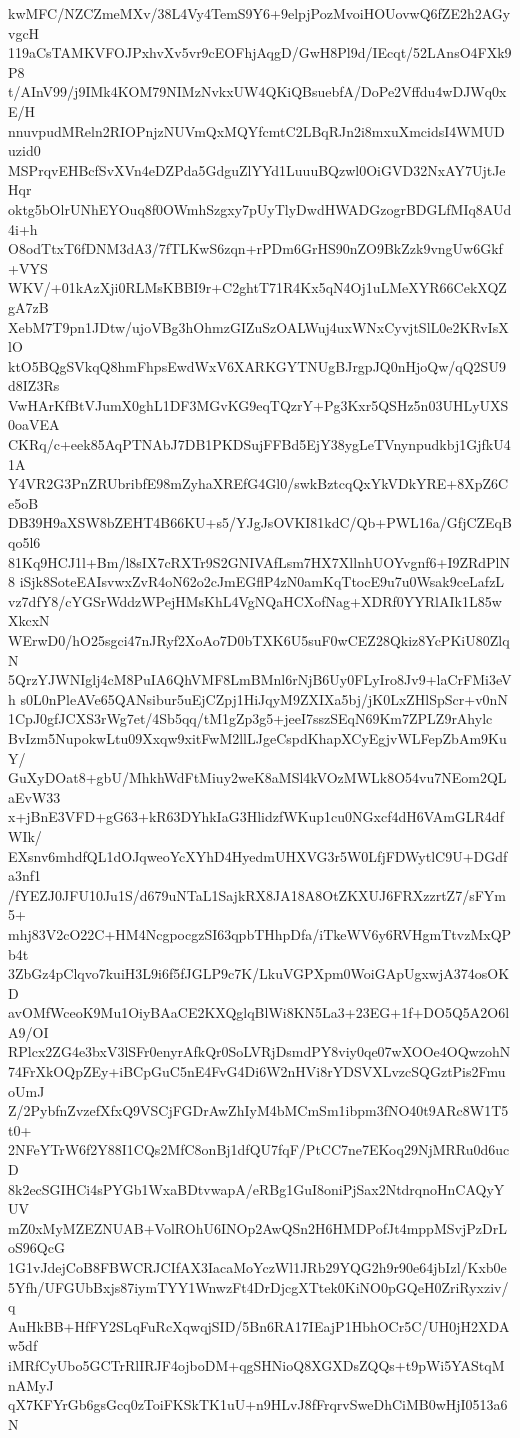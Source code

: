 kwMFC/NZCZmeMXv/38L4Vy4TemS9Y6+9elpjPozMvoiHOUovwQ6fZE2h2AGyvgcH
119aCsTAMKVFOJPxhvXv5vr9cEOFhjAqgD/GwH8Pl9d/IEcqt/52LAnsO4FXk9P8
t/AInV99/j9IMk4KOM79NIMzNvkxUW4QKiQBsuebfA/DoPe2Vffdu4wDJWq0xE/H
nnuvpudMReln2RIOPnjzNUVmQxMQYfcmtC2LBqRJn2i8mxuXmcidsI4WMUDuzid0
MSPrqvEHBcfSvXVn4eDZPda5GdguZlYYd1LuuuBQzwl0OiGVD32NxAY7UjtJeHqr
oktg5bOlrUNhEYOuq8f0OWmhSzgxy7pUyTlyDwdHWADGzogrBDGLfMIq8AUd4i+h
O8odTtxT6fDNM3dA3/7fTLKwS6zqn+rPDm6GrHS90nZO9BkZzk9vngUw6Gkf+VYS
WKV/+01kAzXji0RLMsKBBI9r+C2ghtT71R4Kx5qN4Oj1uLMeXYR66CekXQZgA7zB
XebM7T9pn1JDtw/ujoVBg3hOhmzGIZuSzOALWuj4uxWNxCyvjtSlL0e2KRvIsXlO
ktO5BQgSVkqQ8hmFhpsEwdWxV6XARKGYTNUgBJrgpJQ0nHjoQw/qQ2SU9d8IZ3Rs
VwHArKfBtVJumX0ghL1DF3MGvKG9eqTQzrY+Pg3Kxr5QSHz5n03UHLyUXS0oaVEA
CKRq/c+eek85AqPTNAbJ7DB1PKDSujFFBd5EjY38ygLeTVnynpudkbj1GjfkU41A
Y4VR2G3PnZRUbribfE98mZyhaXREfG4Gl0/swkBztcqQxYkVDkYRE+8XpZ6Ce5oB
DB39H9aXSW8bZEHT4B66KU+s5/YJgJsOVKI81kdC/Qb+PWL16a/GfjCZEqBqo5l6
81Kq9HCJ1l+Bm/l8sIX7cRXTr9S2GNIVAfLsm7HX7XllnhUOYvgnf6+I9ZRdPlN8
iSjk8SoteEAIsvwxZvR4oN62o2cJmEGflP4zN0amKqTtocE9u7u0Wsak9ceLafzL
vz7dfY8/cYGSrWddzWPejHMsKhL4VgNQaHCXofNag+XDRf0YYRlAIk1L85wXkcxN
WErwD0/hO25sgci47nJRyf2XoAo7D0bTXK6U5suF0wCEZ28Qkiz8YcPKiU80ZlqN
5QrzYJWNIglj4cM8PuIA6QhVMF8LmBMnl6rNjB6Uy0FLyIro8Jv9+laCrFMi3eVh
s0L0nPleAVe65QANsibur5uEjCZpj1HiJqyM9ZXIXa5bj/jK0LxZHlSpScr+v0nN
1CpJ0gfJCXS3rWg7et/4Sb5qq/tM1gZp3g5+jeeI7sszSEqN69Km7ZPLZ9rAhylc
BvIzm5NupokwLtu09Xxqw9xitFwM2llLJgeCspdKhapXCyEgjvWLFepZbAm9KuY/
GuXyDOat8+gbU/MhkhWdFtMiuy2weK8aMSl4kVOzMWLk8O54vu7NEom2QLaEvW33
x+jBnE3VFD+gG63+kR63DYhkIaG3HlidzfWKup1cu0NGxcf4dH6VAmGLR4dfWIk/
EXsnv6mhdfQL1dOJqweoYcXYhD4HyedmUHXVG3r5W0LfjFDWytlC9U+DGdfa3nf1
/fYEZJ0JFU10Ju1S/d679uNTaL1SajkRX8JA18A8OtZKXUJ6FRXzzrtZ7/sFYm5+
mhj83V2cO22C+HM4NcgpocgzSI63qpbTHhpDfa/iTkeWV6y6RVHgmTtvzMxQPb4t
3ZbGz4pClqvo7kuiH3L9i6f5fJGLP9c7K/LkuVGPXpm0WoiGApUgxwjA374osOKD
avOMfWceoK9Mu1OiyBAaCE2KXQglqBlWi8KN5La3+23EG+1f+DO5Q5A2O6lA9/OI
RPlcx2ZG4e3bxV3lSFr0enyrAfkQr0SoLVRjDsmdPY8viy0qe07wXOOe4OQwzohN
74FrXkOQpZEy+iBCpGuC5nE4FvG4Di6W2nHVi8rYDSVXLvzcSQGztPis2FmuoUmJ
Z/2PybfnZvzefXfxQ9VSCjFGDrAwZhIyM4bMCmSm1ibpm3fNO40t9ARc8W1T5t0+
2NFeYTrW6f2Y88I1CQs2MfC8onBj1dfQU7fqF/PtCC7ne7EKoq29NjMRRu0d6ucD
8k2ecSGIHCi4sPYGb1WxaBDtvwapA/eRBg1GuI8oniPjSax2NtdrqnoHnCAQyYUV
mZ0xMyMZEZNUAB+VolROhU6INOp2AwQSn2H6HMDPofJt4mppMSvjPzDrLoS96QcG
1G1vJdejCoB8FBWCRJCIfAX3IacaMoYczWl1JRb29YQG2h9r90e64jbIzl/Kxb0e
5Yfh/UFGUbBxjs87iymTYY1WnwzFt4DrDjcgXTtek0KiNO0pGQeH0ZriRyxziv/q
AuHkBB+HfFY2SLqFuRcXqwqjSID/5Bn6RA17IEajP1HbhOCr5C/UH0jH2XDAw5df
iMRfCyUbo5GCTrRlIRJF4ojboDM+qgSHNioQ8XGXDsZQQs+t9pWi5YAStqMnAMyJ
qX7KFYrGb6gsGcq0zToiFKSkTK1uU+n9HLvJ8fFrqrvSweDhCiMB0wHjI0513a6N
